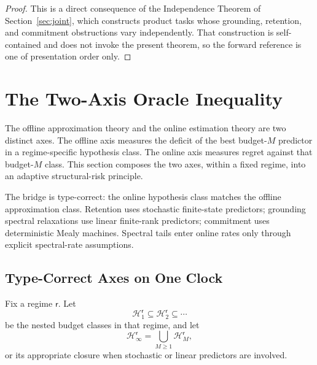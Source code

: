 \documentclass[12pt]{article}
\theoremstyle{definition}
\newcommand{\Hcal}{\mathcal H}
\begin{document}
\begin{proof}
This is a direct consequence of the Independence Theorem of
Section~\ref{sec:joint}, which constructs product tasks whose grounding,
retention, and commitment obstructions vary independently.  That construction
is self-contained and does not invoke the present theorem, so the forward
reference is one of presentation order only.
\end{proof}

\section{The Two-Axis Oracle Inequality}
\label{sec:oracle}

The offline approximation theory and the online estimation theory are two
distinct axes.  The offline axis measures the deficit of the best budget-$M$
predictor in a regime-specific hypothesis class.  The online axis measures
regret against that budget-$M$ class.  This section composes the two axes,
within a fixed regime, into an adaptive structural-risk principle.

The bridge is type-correct: the online hypothesis class matches the offline
approximation class.  Retention uses stochastic finite-state predictors;
grounding spectral relaxations use linear finite-rank predictors; commitment
uses deterministic Mealy machines.  Spectral tails enter online rates only
through explicit spectral-rate assumptions.

\subsection{Type-Correct Axes on One Clock}
\label{subsec:oracle-setup}

Fix a regime $\mathsf r$.  Let
\[
\Hcal_1^{\mathsf r}
\subseteq
\Hcal_2^{\mathsf r}
\subseteq
\cdots
\]
be the nested budget classes in that regime, and let
\[
\Hcal_\infty^{\mathsf r}
=
\bigcup_{M\ge1}\Hcal_M^{\mathsf r},
\]
or its appropriate closure when stochastic or linear predictors are involved.
\end{document}
